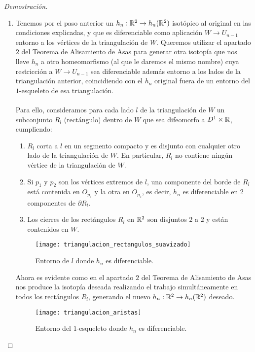 \begin{proof}[Demostración]
\begin{enumerate}
			\item Tenemos por el paso anterior un $h_n: \mathbb{R}^2 \rightarrow h_n(\mathbb{R}^2)$ isotópico al original en las condiciones explicadas, y que es diferenciable como aplicación $W \rightarrow U_{n-1}$ entorno a los vértices de la triangulación de $W$. Queremos utilizar el apartado $2$ del Teorema de Alisamiento de Asas para generar otra isotopía que nos lleve $h_n$ a otro homeomorfismo (al que le daremos el mismo nombre) cuya restricción a $W \rightarrow U_{n-1}$ sea diferenciable además entorno a los lados de la triangulación anterior, coincidiendo con el $h_n$ original fuera de un entorno del $1$-esqueleto de esa triangulación.\\
			\\ Para ello, consideramos para cada lado $l$ de la triangulación de $W$ un subconjunto $R_l$ (rectángulo) dentro de $W$ que sea difeomorfo a $D^1 \times \mathbb{R}$, cumpliendo:
				\begin{enumerate}
					\item $R_l$ corta a $l$ en un segmento compacto y es disjunto con cualquier otro lado de la triangulación de $W$. En particular, $R_l$ no contiene ningún vértice de la triangulación de $W$.
					\item Si $p_1$ y $p_2$ son los vértices extremos de $l$, una componente del borde de $R_l$ está contenida en $O_{p_1}$ y la otra en $O_{p_2}$, es decir, $h_n$ es diferenciable en 2 componentes de $\partial R_l$.
					\item Los cierres de los rectángulos $R_l$ en $\mathbb{R}^2$ son disjuntos $2$ a $2$ y están contenidos en $W$.
				\end{enumerate}
			\begin{figure}[h]
  				\centering
  				\texttt{[image: triangulacion\_rectangulos\_suavizado]}
  				\caption{Entorno de $l$ donde $h_n$ es diferenciable.}
  				\label{fig:triangulacion_rectangulos_suavizado}
			\end{figure}

			Ahora es evidente como en el apartado $2$ del Teorema de Alisamiento de Asas nos produce la isotopía deseada realizando el trabajo simultáneamente en todos los rectángulos $R_l$, generando el nuevo $h_n:\mathbb{R}^2 \rightarrow h_n(\mathbb{R}^2)$ deseado.
			\begin{figure}[h]
  				\centering
  				\texttt{[image: triangulacion\_aristas]}
  				\caption{Entorno del $1$-esqueleto donde $h_n$ es diferenciable.}
  				\label{fig:triangulacion_aristas}
			\end{figure}


\end{enumerate}
\end{proof}
